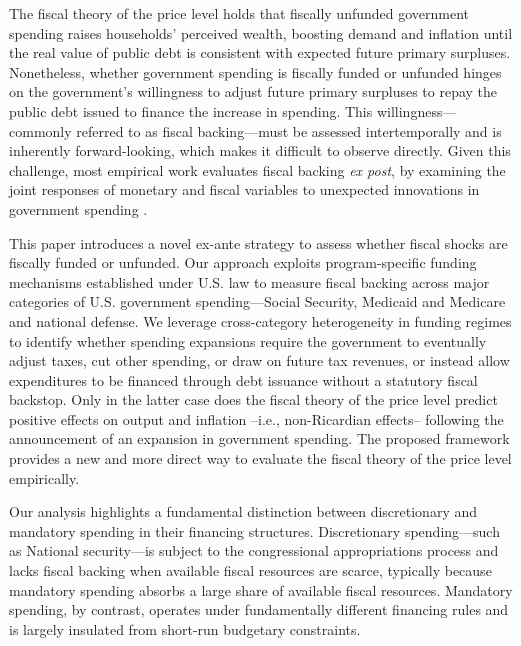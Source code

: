 \documentclass[12pt]{article}%
\theoremstyle{remark}
\begin{document}
The fiscal theory of the price level holds that fiscally unfunded government spending raises households' perceived wealth, boosting demand and inflation until the real value of public debt is consistent with expected future primary surpluses.
Nonetheless, whether government spending is fiscally funded or unfunded hinges on the government’s willingness to adjust future primary surpluses to repay the public debt issued to finance the increase in spending.
This willingness---commonly referred to as fiscal backing---must be assessed intertemporally and is inherently forward-looking, which makes it difficult to observe directly. Given this challenge, most empirical work evaluates fiscal backing \textit{ex post}, by examining the joint responses of monetary and fiscal variables to unexpected innovations in government spending \citep[see, e.g.,][]{Bianchiillut, BM2017, LeeperTraumWalker:2017,EusepiPreston2018,Cochranebook,BFM2023,JacobsonLeeperPreston2024,Barro_Bianchi25}.

This paper introduces a novel ex-ante strategy to assess whether fiscal shocks are fiscally funded or unfunded. Our approach exploits program-specific funding mechanisms established under U.S. law to measure fiscal backing across major categories of U.S. government spending---Social Security, Medicaid and Medicare and national defense. We leverage cross-category heterogeneity in funding regimes to identify whether spending expansions require the government to eventually adjust taxes, cut other spending, or draw on future tax revenues, or instead allow expenditures to be financed through debt issuance without a statutory fiscal backstop. Only in the latter case does the fiscal theory of the price level predict positive effects on output and inflation --i.e., non-Ricardian effects-- following the announcement of an expansion in government spending. The proposed framework provides a new and more direct way to evaluate the fiscal theory of the price level empirically. %

Our analysis highlights a fundamental distinction between discretionary and mandatory spending in their financing structures. Discretionary spending---such as National security---is subject to the congressional appropriations process and lacks fiscal backing when available fiscal resources are scarce, typically because mandatory spending absorbs a large share of available fiscal resources. Mandatory spending, by contrast, operates under fundamentally different financing rules and is largely insulated from short-run budgetary constraints.
\end{document}

